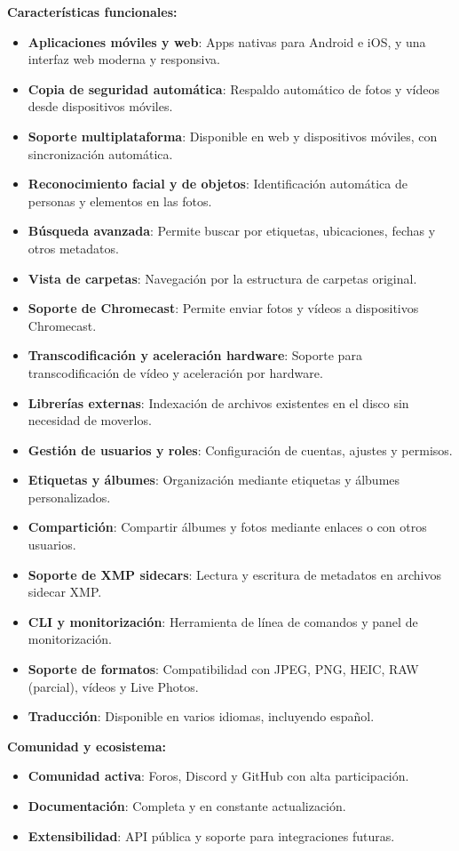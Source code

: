 \textbf{Características funcionales:}
\begin{itemize}
    \item \textbf{Aplicaciones móviles y web}: Apps nativas para Android e iOS, y una interfaz web moderna y responsiva.
    \item \textbf{Copia de seguridad automática}: Respaldo automático de fotos y vídeos desde dispositivos móviles.
    \item \textbf{Soporte multiplataforma}: Disponible en web y dispositivos móviles, con sincronización automática.
    \item \textbf{Reconocimiento facial y de objetos}: Identificación automática de personas y elementos en las fotos.
    \item \textbf{Búsqueda avanzada}: Permite buscar por etiquetas, ubicaciones, fechas y otros metadatos.
    \item \textbf{Vista de carpetas}: Navegación por la estructura de carpetas original.
    \item \textbf{Soporte de Chromecast}: Permite enviar fotos y vídeos a dispositivos Chromecast.
    \item \textbf{Transcodificación y aceleración hardware}: Soporte para transcodificación de vídeo y aceleración por hardware.
    \item \textbf{Librerías externas}: Indexación de archivos existentes en el disco sin necesidad de moverlos.
    \item \textbf{Gestión de usuarios y roles}: Configuración de cuentas, ajustes y permisos.
    \item \textbf{Etiquetas y álbumes}: Organización mediante etiquetas y álbumes personalizados.
    \item \textbf{Compartición}: Compartir álbumes y fotos mediante enlaces o con otros usuarios.
    \item \textbf{Soporte de XMP sidecars}: Lectura y escritura de metadatos en archivos sidecar XMP.
    \item \textbf{CLI y monitorización}: Herramienta de línea de comandos y panel de monitorización.
    \item \textbf{Soporte de formatos}: Compatibilidad con JPEG, PNG, HEIC, RAW (parcial), vídeos y Live Photos.
    \item \textbf{Traducción}: Disponible en varios idiomas, incluyendo español.
\end{itemize}

\textbf{Comunidad y ecosistema:}
\begin{itemize}
    \item \textbf{Comunidad activa}: Foros, Discord y GitHub con alta participación.
    \item \textbf{Documentación}: Completa y en constante actualización.
    \item \textbf{Extensibilidad}: API pública y soporte para integraciones futuras.
\end{itemize}

